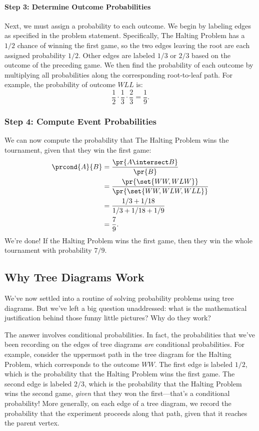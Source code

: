 \paragraph{Step 3:  Determine Outcome Probabilities}

Next, we must assign a probability to each outcome.  We begin by
labeling edges as specified in the problem statement.  Specifically,
The Halting Problem has a $1/2$ chance of winning the first game, so
the two edges leaving the root are each assigned probability $1/2$.
Other edges are labeled $1/3$ or $2/3$ based on the outcome of the
preceding game.  We then find the probability of each outcome by
multiplying all probabilities along the corresponding root-to-leaf
path.  For example, the probability of outcome $WLL$ is:
%
\[
    \frac{1}{2} \cdot \frac{1}{3} \cdot \frac{2}{3} = \frac{1}{9}.
\]

\subsubsection*{Step 4: Compute Event Probabilities}

We can now compute the probability that The Halting Problem wins the
tournament, given that they win the first game:
%
\begingroup
{}
\begin{align*}
\prcond{A}{B}
    & = \frac{\pr{A \intersect B}}{\pr{B}} \\
    & = \frac{\pr{\set{WW, WLW}}}{\pr{\set{WW, WLW, WLL}}} \\
    & = \frac{1/3 + 1/18}{1/3 + 1/18 + 1/9} \\
    & = \frac{7}{9}.
\end{align*}
\endgroup
%
We're done!  If the Halting Problem wins the first game, then they win
the whole tournament with probability $7 / 9$.


\subsection{Why Tree Diagrams Work}\label{product_rule_subsec}

We've now settled into a routine of solving probability problems using
tree diagrams.  But we've left a big question unaddressed: what is the
mathematical justification behind those funny little pictures?  Why do
they work?

The answer involves conditional probabilities.  In fact, the
probabilities that we've been recording on the edges of tree diagrams
\emph{are} conditional probabilities.  For example, consider the
uppermost path in the tree diagram for the Halting Problem, which
corresponds to the outcome $WW$.  The first edge is labeled $1/2$,
which is the probability that the Halting Problem wins the first game.
The second edge is labeled $2 / 3$, which is the probability that the
Halting Problem wins the second game, \emph{given} that they won the
first---that's a conditional probability!  More generally, on each
edge of a tree diagram, we record the probability that the experiment
proceeds along that path, given that it reaches the parent vertex.

